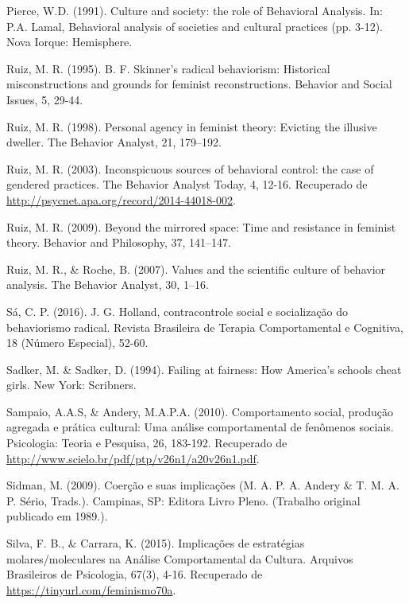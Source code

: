 \hangindent=25pt
\noindent Pierce, W.D. (1991). Culture and society: the role of Behavioral Analysis. In: P.A. Lamal, Behavioral analysis of societies and cultural practices (pp. 3-12). Nova Iorque: Hemisphere.

\hangindent=25pt
\noindent Ruiz, M. R. (1995). B. F. Skinner’s radical behaviorism: Historical misconstructions and grounds for feminist reconstructions. Behavior and Social Issues, 5, 29-44.

\hangindent=25pt
\noindent Ruiz, M. R. (1998). Personal agency in feminist theory: Evicting the illusive dweller. The Behavior Analyst, 21, 179–192.

\hangindent=25pt
\noindent Ruiz, M. R. (2003). Inconspicuous sources of behavioral control: the case of gendered practices. The Behavior Analyst Today, 4, 12-16. Recuperado de\\ \url{http://psycnet.apa.org/record/2014-44018-002}.

\hangindent=25pt
\noindent Ruiz, M. R. (2009). Beyond the mirrored space: Time and resistance in feminist theory. Behavior and Philosophy, 37, 141–147.

\hangindent=25pt
\noindent Ruiz, M. R., \& Roche, B. (2007). Values and the scientific culture of behavior analysis. The Behavior Analyst, 30, 1–16.

\hangindent=25pt
\noindent Sá, C. P. (2016). J. G. Holland, contracontrole social e socialização do behaviorismo radical. Revista Brasileira de Terapia Comportamental e Cognitiva, 18 (Número Especial), 52-60.

\hangindent=25pt
\noindent Sadker, M. \& Sadker, D. (1994). Failing at fairness: How America’s schools cheat girls. New York: Scribners.

\hangindent=25pt
\noindent Sampaio, A.A.S, \& Andery, M.A.P.A. (2010). Comportamento social, produção agregada e prática cultural: Uma análise comportamental de fenômenos sociais. Psicologia: Teoria e Pesquisa, 26, 183-192. Recuperado de\\ \url{http://www.scielo.br/pdf/ptp/v26n1/a20v26n1.pdf}.

\hangindent=25pt
\noindent Sidman, M. (2009). Coerção e suas implicações (M. A. P. A. Andery \& T. M. A. P. Sério, Trads.). Campinas, SP: Editora Livro Pleno. (Trabalho original publicado em 1989.).

\hangindent=25pt
\noindent Silva, F. B., \& Carrara, K. (2015). Implicações de estratégias molares/moleculares na Análise Comportamental da Cultura. Arquivos Brasileiros de Psicologia, 67(3), 4-16. Recuperado de \url{https://tinyurl.com/feminismo70a}.

